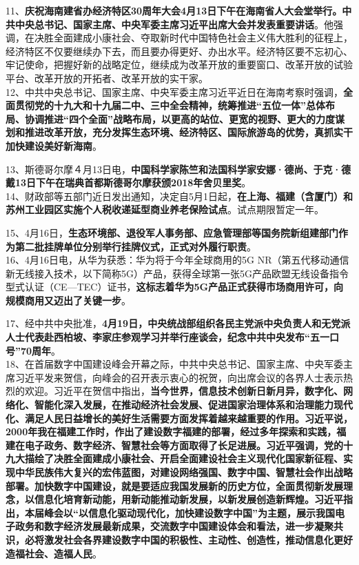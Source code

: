 11、{\textbf{庆祝海南建省办经济特区30周年大会4月13日下午在海南省人大会堂举行。中共中央总书记、国家主席、中央军委主席习近平出席大会并发表重要讲话}}。他强调，在决胜全面建成小康社会、夺取新时代中国特色社会主义伟大胜利的征程上，经济特区不仅要继续办下去，而且要办得更好、办出水平。经济特区要不忘初心、牢记使命，把握好新的战略定位，继续成为改革开放的重要窗口、改革开放的试验平台、改革开放的开拓者、改革开放的实干家。\\
12、中共中央总书记、国家主席、中央军委主席习近平近日在海南考察时强调，{\textbf{全面贯彻党的十九大和十九届二中、三中全会精神，统筹推进``五位一体''总体布局、协调推进``四个全面''战略布局，以更高的站位、更宽的视野、更大的力度谋划和推进改革开放，充分发挥生态环境、经济特区、国际旅游岛的优势，真抓实干加快建设美好新海南}}。

13、斯德哥尔摩４月13日电，{\textbf{中国科学家陈竺和法国科学家安娜·德尚、于克·德戴13日下午在瑞典首都斯德哥尔摩获颁2018年舍贝里奖}}。\\
14、财政部等五部门近日发出通知，决定自5月1日起，{\textbf{在上海、福建（含厦门）和苏州工业园区实施个人税收递延型商业养老保险试点}}。试点期限暂定一年。

15、4月16日，{\textbf{生态环境部、退役军人事务部、应急管理部等国务院新组建部门作为第二批挂牌单位分别举行挂牌仪式，正式对外履行职责}}。\\
16、4月16日电，从华为获悉：华为将于今年全球商用的5G
NR（第五代移动通信新无线接入技术，以下简称5G）产品，获得全球第一张5G产品欧盟无线设备指令型式认证（CE---TEC）证书，\textbf{{这标志着华为5G产品正式获得市场商用许可，向规模商用又迈出了关键一步}}。

17、经中共中央批准，{\textbf{4月19日，中央统战部组织各民主党派中央负责人和无党派人士代表赴西柏坡、李家庄参观学习并举行座谈会，纪念中共中央发布``五一口号''70周年}}。\\
18、在首届数字中国建设峰会开幕之际，中共中央总书记、国家主席、中央军委主席习近平发来贺信，向峰会的召开表示衷心的祝贺，向出席会议的各界人士表示热烈的欢迎。习近平在贺信中指出，{\textbf{当今世界，信息技术创新日新月异，数字化、网络化、智能化深入发展，在推动经济社会发展、促进国家治理体系和治理能力现代化、满足人民日益增长的美好生活需要方面发挥着越来越重要的作用。习近平说，2000年我在福建工作时，作出了建设数字福建的部署，经过多年探索和实践，福建在电子政务、数字经济、智慧社会等方面取得了长足进展。习近平强调，党的十九大描绘了决胜全面建成小康社会、开启全面建设社会主义现代化国家新征程、实现中华民族伟大复兴的宏伟蓝图，对建设网络强国、数字中国、智慧社会作出战略部署。加快数字中国建设，就是要适应我国发展新的历史方位，全面贯彻新发展理念，以信息化培育新动能，用新动能推动新发展，以新发展创造新辉煌。习近平指出，本届峰会以``以信息化驱动现代化，加快建设数字中国''为主题，展示我国电子政务和数字经济发展最新成果，交流数字中国建设体会和看法，进一步凝聚共识，必将激发社会各界建设数字中国的积极性、主动性、创造性，推动信息化更好造福社会、造福人民}}。

